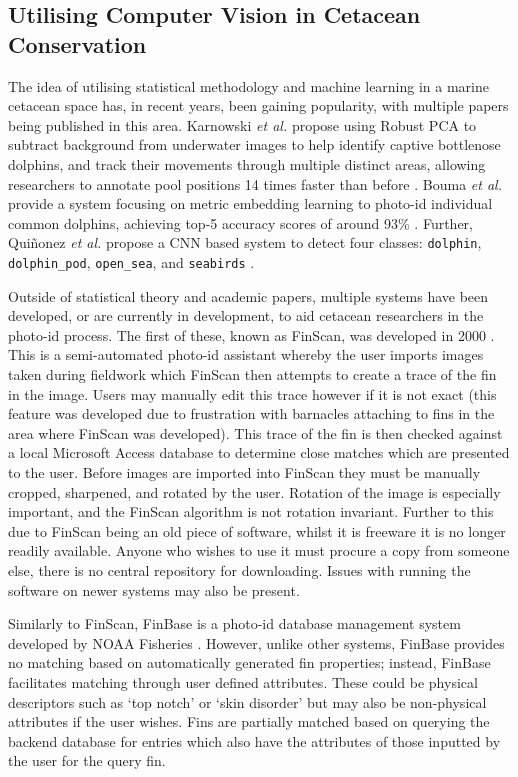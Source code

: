 \subsection{Utilising Computer Vision in Cetacean Conservation}\label{ch:Background,sec:conTech,sub:cetaceanDetection}

The idea of utilising statistical methodology and machine learning in a marine cetacean space has, in recent years, been gaining popularity, with multiple papers being published in this area. Karnowski \textit{et al.} propose using Robust PCA to subtract background from underwater images to help identify captive bottlenose dolphins, and track their movements through multiple distinct areas, allowing researchers to annotate pool positions 14 times faster than before \cite{karnowski_dolphin_2015}. Bouma \textit{et al.} provide a system focusing on metric embedding learning to photo-id individual common dolphins, achieving top-5 accuracy scores of around 93\% \cite{bouma_individual_2018}. Further, Qui\~{n}onez \textit{et al.} propose a CNN based system to detect four classes: \texttt{dolphin}, \texttt{dolphin\_pod}, \texttt{open\_sea}, and \texttt{seabirds} \cite{quinonez_using_2019}. 

Outside of statistical theory and academic papers, multiple systems have been developed, or are currently in development, to aid cetacean researchers in the photo-id process. The first of these, known as FinScan, was developed in 2000 \cite{hillman_finscan_2002}. This is a semi-automated photo-id assistant whereby the user imports images taken during fieldwork which FinScan then attempts to create a trace of the fin in the image. Users may manually edit this trace however if it is not exact (this feature was developed due to frustration with barnacles attaching to fins in the area where FinScan was developed). This trace of the fin is then checked against a local Microsoft Access database to determine close matches which are presented to the user. Before images are imported into FinScan they must be manually cropped, sharpened, and rotated by the user. Rotation of the image is especially important, and the FinScan algorithm is not rotation invariant. Further to this due to FinScan being an old piece of software, whilst it is freeware it is no longer readily available. Anyone who wishes to use it must procure a copy from someone else, there is no central repository for downloading. Issues with running the software on newer systems may also be present.

Similarly to FinScan, FinBase is a photo-id database management system developed by NOAA Fisheries \cite{fisheries_finbase_2018}. However, unlike other systems, FinBase provides no matching based on automatically generated fin properties; instead, FinBase facilitates matching through user defined attributes. These could be physical descriptors such as `top notch' or `skin disorder' but may also be non-physical attributes if the user wishes. Fins are partially matched based on querying the backend database for entries which also have the attributes of those inputted by the user for the query fin. 

